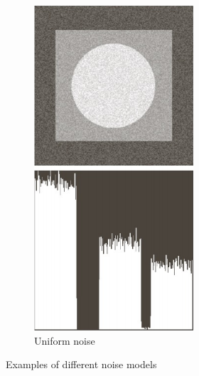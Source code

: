 \begin{figure}[H]
\begin{subfigure}[b]{0.22\textwidth}
        \label{fig:noise_gaussian}
    \end{subfigure}
    \begin{subfigure}[b]{0.2175\textwidth}
        \includegraphics[width=\textwidth]{img3/noise_u.png}
        \caption{Uniform noise}
        \label{fig:noise_uniform}
    \end{subfigure}
    \caption{Examples of different noise models}
    \label{fig:noise_examples_img3}
\end{figure}

